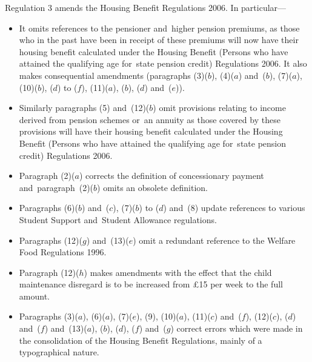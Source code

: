 \documentclass[12pt,a4paper]{article}
\begin{document}
Regulation 3 amends the Housing Benefit Regulations 2006. In particular---
\begin{itemize}
\item
    It omits references to the pensioner and~higher pension premiums, as those who in the past have been in receipt of these premiums will now have their housing benefit calculated under the Housing Benefit (Persons who have attained the qualifying age for~state pension credit) Regulations 2006. It also makes consequential amendments (paragraphs (3)($b$), (4)($a$)  and~($b$), (7)($a$), (10)($b$), ($d$)  to ($f$), (11)($a$), ($b$), ($d$)  and~($e$)).

\item
    Similarly paragraphs (5) and~(12)($b$)  omit provisions relating to income derived from pension schemes or~an annuity as those covered by these provisions will have their housing benefit calculated under the Housing Benefit (Persons who have attained the qualifying age for~state pension credit) Regulations 2006.

\item
    Paragraph (2)($a$)  corrects the definition of concessionary payment and~paragraph~(2)($b$)  omits an obsolete definition.

\item
    Paragraphs (6)($b$)  and~($c$), (7)($b$)  to ($d$)  and~(8) update references to various Student Support and~Student Allowance regulations.

\item
    Paragraphs (12)($g$)  and~(13)($e$)  omit a redundant reference to the Welfare Food Regulations 1996.

\item
    Paragraph (12)($h$)  makes amendments with the effect that the child maintenance disregard is to be increased from £15 per week to the full amount.

\item
    Paragraphs (3)($a$), (6)($a$), (7)($e$), (9), (10)($a$), (11)($c$)  and~($f$), (12)($c$), ($d$)  and~($f$)  and~(13)($a$), ($b$), ($d$), ($f$)  and~($g$)  correct errors which were made in the consolidation of the Housing Benefit Regulations, mainly of a typographical nature. 
\end{itemize}
\end{document}

